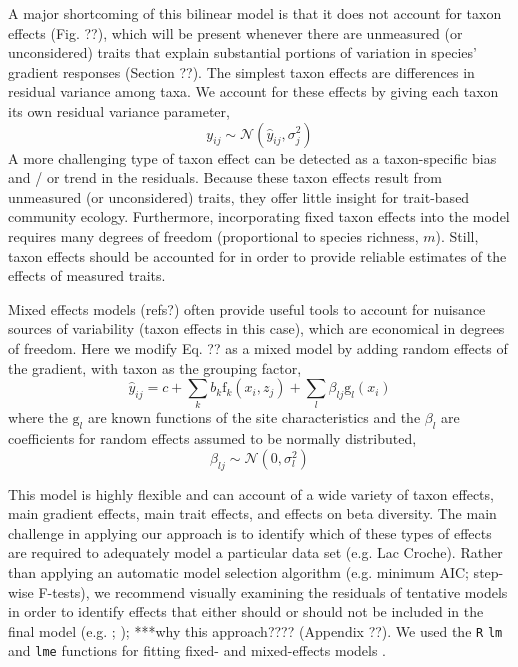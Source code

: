 \documentclass[12pt]{ecology}
\begin{document}
A major shortcoming of this bilinear model is that it does not account for taxon effects (Fig. ??), which will be present whenever there are unmeasured (or unconsidered) traits that explain substantial portions of variation in species' gradient responses (Section ??).  The simplest taxon effects are differences in residual variance among taxa.  We account for these effects by giving each taxon its own residual variance parameter,
\begin{equation}
y_{ij} \sim \mathcal{N}(\hat{y}_{ij},\sigma_j^2)
\end{equation}
A more challenging type of taxon effect can be detected as a taxon-specific bias and / or trend in the residuals.  Because these taxon effects result from unmeasured (or unconsidered) traits, they offer little insight for trait-based community ecology.  Furthermore, incorporating fixed taxon effects into the model requires many degrees of freedom (proportional to species richness, $m$).  Still, taxon effects should be accounted for in order to provide reliable estimates of the effects of measured traits.

Mixed effects models (refs?) often provide useful tools to account for nuisance sources of variability (taxon effects in this case), which are economical in degrees of freedom.  Here we modify Eq. ?? as a mixed model by adding random effects of the gradient, with taxon as the grouping factor,
\begin{equation}
\hat{y}_{ij} = c + 
	\sum_k b_k \mathrm{f}_k (x_i, z_j) + 
	\sum_l \beta_{lj} \mathrm{g}_l (x_i)
\end{equation}
where the $\mathrm{g}_l$ are known functions of the site characteristics and the $\beta_l$ are coefficients for random effects assumed to be normally distributed,
\begin{equation}
\beta_{lj} \sim \mathcal{N}(0,\sigma_l^2)
\end{equation}

This model is highly flexible and can account of a wide variety of taxon effects, main gradient effects, main trait effects, and effects on beta diversity.  The main challenge in applying our approach is to identify which of these types of effects are required to adequately model a particular data set (e.g. Lac Croche).  Rather than applying an automatic model selection algorithm (e.g. minimum AIC; step-wise F-tests), we recommend visually examining the residuals of tentative models in order to identify effects that either should or should not be included in the final model (e.g. ; ); ***why this approach???? (Appendix ??).  We used the \texttt{R} \texttt{lm} and \texttt{lme} functions for fitting fixed- and mixed-effects models \citep{R2009}.
\end{document}
